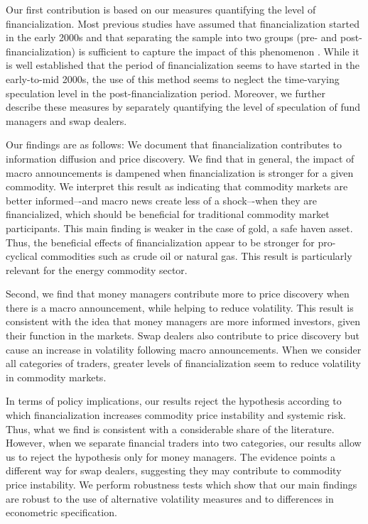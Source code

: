 \documentclass[12pt]{article}
\begin{document}
Our first contribution is based on our measures quantifying the level of financialization. Most previous studies have assumed that financialization started in the early 2000s and that separating the sample into two groups (pre- and post-financialization) is sufficient to capture the impact of this phenomenon \citep{buyukcsahin2010matters, kilian2014role,brunetti2016speculators,irwin2012financialization,stoll2010commodity,alquist2013role}. While it is well established that the period of financialization seems to have started in the early-to-mid 2000s, the use of this method seems to neglect the time-varying speculation level in the post-financialization period. Moreover, we further describe these measures by separately quantifying the level of speculation of fund managers and swap dealers.

 Our findings are as follows: We document that financialization contributes to information diffusion and price discovery. We find that in general, the impact of macro announcements is dampened when financialization is stronger for a given commodity. We interpret this result as indicating that commodity markets are better informed–-and macro news create less of a shock–-when they are financialized, which should be beneficial for traditional commodity market participants. This main finding is weaker in the case of gold, a safe haven asset. Thus, the beneficial effects of financialization appear to be stronger for pro-cyclical commodities such as crude oil or natural gas. This result is particularly relevant for the energy commodity sector. 

Second, we find that money managers contribute more to price discovery when there is a macro announcement, while helping to reduce volatility. This result is consistent with the idea that money managers are more informed investors, given their function in the markets. Swap dealers also contribute to price discovery but  cause an increase in volatility following macro announcements. When we consider all categories of traders, greater levels of financialization seem to reduce  volatility in commodity markets. 

In terms of policy implications, our results reject the \citet{masters2009testimony} hypothesis according to which  financialization increases commodity price instability and systemic risk. Thus, what we find is consistent with a considerable share of the literature. However, when we separate financial traders into two categories, our results allow us to reject  the \citet{masters2009testimony} hypothesis only for money managers. The evidence points a different way for swap dealers, suggesting they may contribute to commodity price instability. We perform robustness tests which show that our main findings are robust to the use of alternative volatility measures and to differences in econometric specification.
\end{document}
